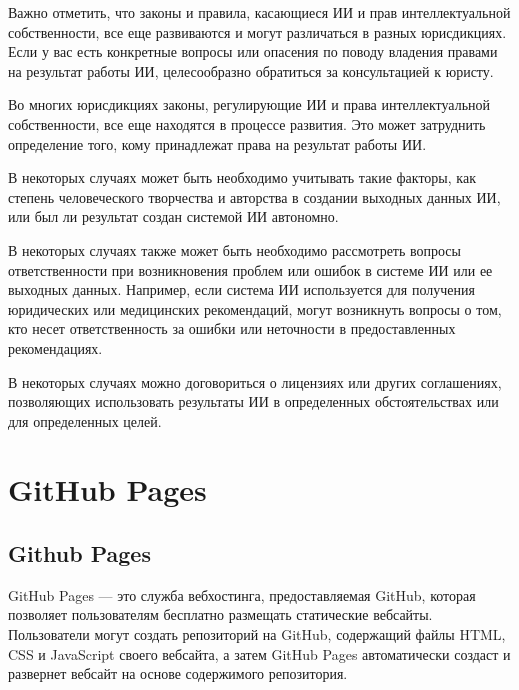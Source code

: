 \documentclass[letterpaper,10pt,russian]{sphinxmanual}
\begin{document}
\sphinxAtStartPar
Важно отметить, что законы и правила, касающиеся ИИ и прав интеллектуальной собственности, все еще развиваются и могут различаться в разных юрисдикциях. Если у вас есть конкретные вопросы или опасения по поводу владения правами на результат работы ИИ, целесообразно обратиться за консультацией к юристу.

\sphinxAtStartPar
Во многих юрисдикциях законы, регулирующие ИИ и права интеллектуальной собственности, все еще находятся в процессе развития. Это может затруднить определение того, кому принадлежат права на результат работы ИИ.

\sphinxAtStartPar
В некоторых случаях может быть необходимо учитывать такие факторы, как степень человеческого творчества и авторства в создании выходных данных ИИ, или был ли результат создан системой ИИ автономно.

\sphinxAtStartPar
В некоторых случаях также может быть необходимо рассмотреть вопросы ответственности при возникновения проблем или ошибок в системе ИИ или ее выходных данных. Например, если система ИИ используется для получения юридических или медицинских рекомендаций, могут возникнуть вопросы о том, кто несет ответственность за ошибки или неточности в предоставленных рекомендациях.

\sphinxAtStartPar
В некоторых случаях можно договориться о лицензиях или других соглашениях, позволяющих использовать результаты ИИ в определенных обстоятельствах или для определенных целей.


\chapter{GitHub Pages}
\label{\detokenize{index:github-pages}}
\sphinxstepscope


\section{Github Pages}
\label{\detokenize{educational_materials/github_pages/content:github-pages}}\label{\detokenize{educational_materials/github_pages/content::doc}}
\sphinxAtStartPar
{}

\sphinxAtStartPar
GitHub Pages — это служба веб\sphinxhyphen{}хостинга, предоставляемая GitHub, которая позволяет пользователям бесплатно размещать статические веб\sphinxhyphen{}сайты. Пользователи могут создать репозиторий на GitHub, содержащий файлы HTML, CSS и JavaScript своего веб\sphinxhyphen{}сайта, а затем GitHub Pages автоматически создаст и развернет веб\sphinxhyphen{}сайт на основе содержимого репозитория.
\end{document}
